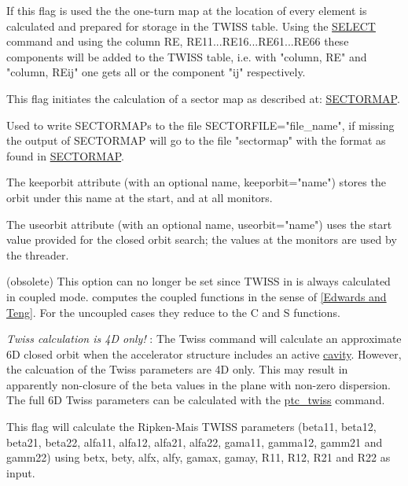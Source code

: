 \begin{madlist}
   If this flag is used the the one-turn map at the
  location of every element is calculated and prepared for
  storage in the TWISS table. Using the
  \href{../Introduction/select.html}{SELECT} command and using
  the column RE, RE11...RE16...RE61...RE66 these components will
  be added to the TWISS table, i.e. with "column, RE" and
  "column, REij" one gets all or the component "ij"
  respectively.    

   This flag initiates the calculation of a sector
  map as described at:
  \href{../Introduction/sectormap.html}{SECTORMAP}.    
  
   Used to write SECTORMAPs to the file
  SECTORFILE="file\_name", if missing the output of SECTORMAP
  will go to the file "sectormap" with the format as found in
  \href{../Introduction/sectormap.html}{SECTORMAP}.    
  
   The keeporbit attribute (with an optional name,
  keeporbit="name") stores the orbit under this name at the
  start, and at all monitors.    

   The useorbit attribute (with an optional name,
  useorbit="name") uses the start value provided for the closed
  orbit search; the values at the monitors are used by the
  threader.    

   (obsolete) This \madeight option can no
  longer be set since TWISS in \madx is always calculated in
  coupled mode. \madx computes the coupled functions in the
  sense of
  \href{../Introduction/bibliography.html#edwards}{[Edwards and
      Teng]}. For the uncoupled cases they reduce to the C and S
  functions.    
  
  \textit{ Twiss calculation is 4D only!} : The Twiss
  command will calculate an approximate 6D closed orbit when the
  accelerator structure includes an active
  \href{../Introduction/cavity.html}{cavity}. However, the
  calcuation of the Twiss parameters are 4D only. This may
  result in apparently non-closure of the beta values in the
  plane with non-zero dispersion. The full 6D Twiss parameters
  can be calculated with the
  \href{../ptc_twiss/ptc_twiss.html}{ptc\_twiss} command.    

   This flag will calculate the Ripken-Mais TWISS
  parameters (beta11, beta12, beta21, beta22, alfa11, alfa12,
  alfa21, alfa22, gama11, gamma12, gamm21 and gamm22) using
  betx, bety, alfx, alfy, gamax, gamay, R11, R12, R21 and R22 as
  input.  

\end{madlist}

